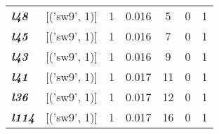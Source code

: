\begin{table}
\begin{tabular}{llccccc}
    \textbf{\textit{l48}}                                                                        & {[}('sw9', 1)]                       & 1             & 0.016          & 5              & 0              & 1                                 \\
    \textbf{\textit{l45}}                                                                        & {[}('sw9', 1)]                       & 1             & 0.016          & 7              & 0              & 1                                 \\
    \textbf{\textit{l43}}                                                                        & {[}('sw9', 1)]                       & 1             & 0.016          & 9              & 0              & 1                                 \\
    \textbf{\textit{l41}}                                                                        & {[}('sw9', 1)]                       & 1             & 0.017          & 11             & 0              & 1                                 \\
    \textbf{\textit{l36}}                                                                        & {[}('sw9', 1)]                       & 1             & 0.017          & 12             & 0              & 1                                 \\
    \textbf{\textit{l114}}                                                                       & {[}('sw9', 1)]                       & 1             & 0.017          & 16             & 0              & 1                                 \\
    \hline
    \end{tabular}
    \end{table}
